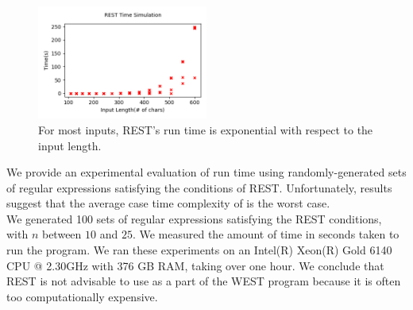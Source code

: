 \documentclass[runningheads]{llncs}
\begin{document}
\begin{figure}
  \centering
        \includegraphics[width=0.5\textwidth]{images/RESTtime.png}
        \caption{\small For most inputs, REST's run time is exponential with respect to the input length.}
        \label{fig:RESTexp}  
\end{figure}
We provide an experimental evaluation of run time using randomly-generated sets of regular expressions satisfying the conditions of REST. Unfortunately, results suggest that the average case time complexity of is the worst case.\\
We generated 100 sets of regular expressions satisfying the REST conditions, with $n$ between $10$ and $25$. 
We measured the amount of time in seconds taken to run the program.
We ran these experiments on an Intel(R) Xeon(R) Gold 6140 CPU @ 2.30GHz with 376 GB RAM, taking over one hour. We conclude that REST is not advisable to use as a part of the WEST program because it is often too computationally expensive.
\end{document}
